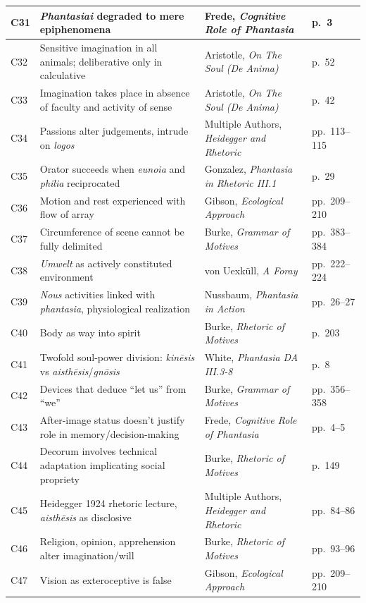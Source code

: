 \documentclass[12pt]{article}
\begin{document}
\begin{center}
\begin{tabular}{|l|l|l|l|}
\hline
C31 & \textit{Phantasiai} degraded to mere epiphenomena & Frede, \textit{Cognitive Role of Phantasia} & p.~3 \\
\hline
C32 & Sensitive imagination in all animals; deliberative only in calculative & Aristotle, \textit{On The Soul (De Anima)} & p.~52 \\
\hline
C33 & Imagination takes place in absence of faculty and activity of sense & Aristotle, \textit{On The Soul (De Anima)} & p.~42 \\
\hline
C34 & Passions alter judgements, intrude on \textit{logos} & Multiple Authors, \textit{Heidegger and Rhetoric} & pp.~113--115 \\
\hline
C35 & Orator succeeds when \textit{eunoia} and \textit{philia} reciprocated & Gonzalez, \textit{Phantasia in Rhetoric III.1} & p.~29 \\
\hline
C36 & Motion and rest experienced with flow of array & Gibson, \textit{Ecological Approach} & pp.~209--210 \\
\hline
C37 & Circumference of scene cannot be fully delimited & Burke, \textit{Grammar of Motives} & pp.~383--384 \\
\hline
C38 & \textit{Umwelt} as actively constituted environment & von Uexküll, \textit{A Foray} & pp.~222--224 \\
\hline
C39 & \textit{Nous} activities linked with \textit{phantasia}, physiological realization & Nussbaum, \textit{Phantasia in Action} & pp.~26--27 \\
\hline
C40 & Body as way into spirit & Burke, \textit{Rhetoric of Motives} & p.~203 \\
\hline
C41 & Twofold soul-power division: \textit{kinēsis} vs \textit{aisthēsis}/\textit{gnōsis} & White, \textit{Phantasia DA III.3-8} & p.~8 \\
\hline
C42 & Devices that deduce ``let us'' from ``we'' & Burke, \textit{Grammar of Motives} & pp.~356--358 \\
\hline
C43 & After-image status doesn't justify role in memory/decision-making & Frede, \textit{Cognitive Role of Phantasia} & pp.~4--5 \\
\hline
C44 & Decorum involves technical adaptation implicating social propriety & Burke, \textit{Rhetoric of Motives} & p.~149 \\
\hline
C45 & Heidegger 1924 rhetoric lecture, \textit{aisthēsis} as disclosive & Multiple Authors, \textit{Heidegger and Rhetoric} & pp.~84--86 \\
\hline
C46 & Religion, opinion, apprehension alter imagination/will & Burke, \textit{Rhetoric of Motives} & pp.~93--96 \\
\hline
C47 & Vision as exteroceptive is false & Gibson, \textit{Ecological Approach} & pp.~209--210 \\
\hline
\end{tabular}
\end{center}
\end{document}
